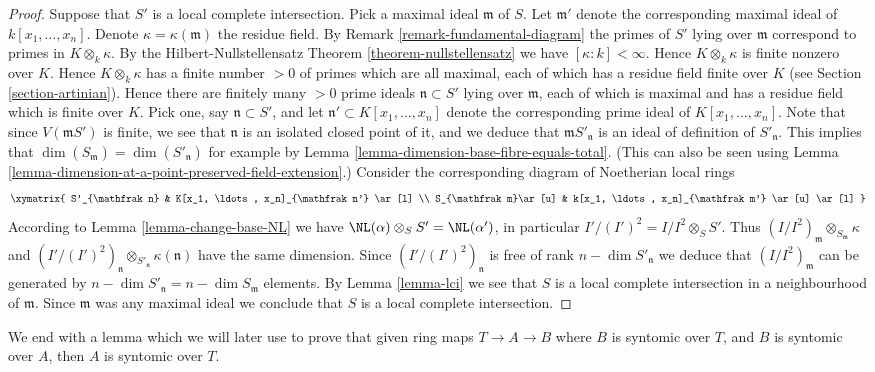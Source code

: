 \begin{proof}
\medskip\noindent
Suppose that $S'$ is a local complete intersection.
Pick a maximal ideal $\mathfrak m$ of $S$. Let $\mathfrak m'$
denote the corresponding maximal ideal of $k[x_1, \ldots, x_n]$.
Denote $\kappa = \kappa(\mathfrak m)$ the residue field.
By Remark \ref{remark-fundamental-diagram} the primes of
$S'$ lying over $\mathfrak m$ correspond to primes
in $K \otimes_k \kappa$. By the Hilbert-Nullstellensatz
Theorem \ref{theorem-nullstellensatz} we have $[\kappa : k] < \infty$.
Hence $K \otimes_k \kappa$ is finite nonzero over $K$.
Hence $K \otimes_k \kappa$ has a finite number $> 0$ of primes
which are all maximal, each of which has a residue field
finite over $K$ (see Section \ref{section-artinian}).
Hence there are finitely many $> 0$ prime ideals
$\mathfrak n \subset S'$ lying over $\mathfrak m$,
each of which is maximal and  has a residue field
which is finite over $K$. Pick one, say $\mathfrak n \subset S'$,
and let $\mathfrak n' \subset K[x_1, \ldots, x_n]$ denote the corresponding
prime ideal of $K[x_1, \ldots, x_n]$.
Note that since $V(\mathfrak mS')$ is finite, we see that
$\mathfrak n$ is an isolated closed point of it, and we
deduce that $\mathfrak mS'_{\mathfrak n}$ is an ideal of definition
of $S'_{\mathfrak n}$. This implies that
$\dim(S_{\mathfrak m}) = \dim(S'_{\mathfrak n})$ for example by
Lemma \ref{lemma-dimension-base-fibre-equals-total}.
(This can also be seen using
Lemma \ref{lemma-dimension-at-a-point-preserved-field-extension}.)
Consider the corresponding diagram of Noetherian local rings
$$
\xymatrix{
S'_{\mathfrak n} &  K[x_1, \ldots, x_n]_{\mathfrak n'} \ar[l] \\
S_{\mathfrak m}\ar[u] &  k[x_1, \ldots, x_n]_{\mathfrak m'} \ar[u] \ar[l]
}
$$
According to Lemma \ref{lemma-change-base-NL} we have
$\NL(\alpha) \otimes_S S' = \NL(\alpha')$, in particular
$I'/(I')^2 = I/I^2 \otimes_S S'$. Thus
$(I/I^2)_{\mathfrak m} \otimes_{S_{\mathfrak m}} \kappa$
and
$(I'/(I')^2)_{\mathfrak n} \otimes_{S'_{\mathfrak n}} \kappa(\mathfrak n)$
have the same dimension. Since $(I'/(I')^2)_{\mathfrak n}$
is free of rank $n - \dim S'_{\mathfrak n}$ we deduce that
$(I/I^2)_{\mathfrak m}$ can be generated by
$n - \dim S'_{\mathfrak n} = n - \dim S_{\mathfrak m}$ elements.
By Lemma \ref{lemma-lci} we see that $S$ is a local
complete intersection in a neighbourhood of $\mathfrak m$.
Since $\mathfrak m$ was any maximal ideal we conclude that
$S$ is a local complete intersection.
\end{proof}

\noindent
We end with a lemma which we will later use to prove that
given ring maps $T \to A \to B$ where $B$ is syntomic over $T$,
and $B$ is syntomic over $A$, then $A$ is syntomic over $T$.

